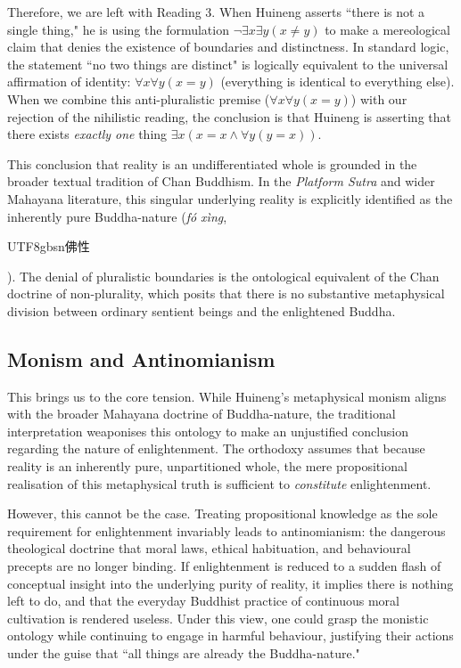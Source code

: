 Therefore, we are left with Reading 3. When Huineng asserts ``there is
not a single thing," he is using the formulation $\neg \exists x \exists y(x \neq y)$ to make a
mereological claim that denies the existence of boundaries and
distinctness. In standard logic, the statement ``no two things are
distinct" is logically equivalent to the universal affirmation of
identity: $\forall x \forall y(x=y)$ (everything is identical to everything else). When
we combine this anti-pluralistic premise ($\forall x \forall y(x=y)$) with our rejection
of the nihilistic reading, the conclusion is that Huineng is asserting
that there exists \emph{exactly one} thing $\exists x(x=x \land \forall y(y=x))$.

This conclusion that reality is an undifferentiated whole is grounded in
the broader textual tradition of Chan Buddhism. In the \emph{Platform
Sutra} and wider Mahayana literature, this singular underlying reality
is explicitly identified as the inherently pure Buddha-nature (\emph{fó
xìng}, \begin{CJK*}{UTF8}{gbsn}佛性\end{CJK*}). The denial of pluralistic boundaries is the ontological
equivalent of the Chan doctrine of non-plurality, which posits that
there is no substantive metaphysical division between ordinary sentient
beings and the enlightened Buddha.

\subsection{Monism and Antinomianism}

This brings us to the core tension. While Huineng's metaphysical monism
aligns with the broader Mahayana doctrine of Buddha-nature, the
traditional interpretation weaponises this ontology to make an
unjustified conclusion regarding the nature of enlightenment. The
orthodoxy assumes that because reality is an inherently pure,
unpartitioned whole, the mere propositional realisation of this
metaphysical truth is sufficient to \emph{constitute} enlightenment.

However, this cannot be the case. Treating propositional knowledge as
the sole requirement for enlightenment invariably leads to
antinomianism: the dangerous theological doctrine that moral laws,
ethical habituation, and behavioural precepts are no longer binding. If
enlightenment is reduced to a sudden flash of conceptual insight into
the underlying purity of reality, it implies there is nothing left to
do, and that the everyday Buddhist practice of continuous moral
cultivation is rendered useless. Under this view, one could grasp the
monistic ontology while continuing to engage in harmful behaviour,
justifying their actions under the guise that ``all things are already
the Buddha-nature."

